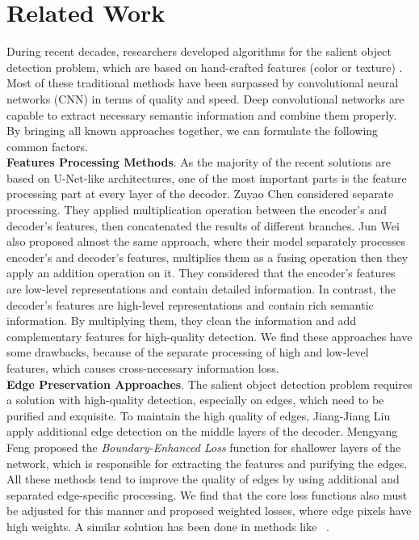 \documentclass[10pt,twocolumn,letterpaper]{article}
\begin{document}
\section{Related Work}
During recent decades, researchers developed algorithms for the salient object detection problem, which are based on hand-crafted features (\eg color or texture) \cite{old_sod1, old_sod2, old_sod3, old_sod4}. Most of these traditional methods have been surpassed by convolutional neural networks (CNN) in terms of quality and speed. Deep convolutional networks are capable to extract necessary semantic information and combine them properly. By bringing all known approaches together, we can formulate the following common factors. \\
\textbf{Features Processing Methods}. As the majority of the recent solutions are based on U-Net-like architectures, one of the most important parts is the feature processing part at every layer of the decoder. Zuyao Chen \etal \cite{GCPANet} considered separate processing. They applied multiplication operation between the encoder's and decoder's features, then concatenated the results of different branches. Jun Wei \etal \cite{F3Net} also proposed almost the same approach, where their model separately processes encoder's and decoder's features, multiplies them as a fusing operation then they apply an addition operation on it. They considered that the encoder's features are low-level representations and contain detailed information. In contrast, the decoder's features are high-level representations and contain rich semantic information. By multiplying them, they clean the information and add complementary features for high-quality detection. We find these approaches have some drawbacks, because of the separate processing of high and low-level features, which causes cross-necessary information loss. \\
\textbf{Edge Preservation Approaches}. The salient object detection problem requires a solution with high-quality detection, especially on edges, which need to be purified and exquisite. To maintain the high quality of edges, Jiang-Jiang Liu \etal \cite{PoolNet} apply additional edge detection on the middle layers of the decoder. Mengyang Feng \etal \cite{AFNet} proposed the \textit{Boundary-Enhanced Loss} function for shallower layers of the network, which is responsible for extracting the features and purifying the edges. All these methods tend to improve the quality of edges by using additional and separated edge-specific processing. We find that the core loss functions also must be adjusted for this manner and proposed weighted losses, where edge pixels have high weights. A similar solution has been done in methods like ~\cite{F3Net}. \\
\end{document}
